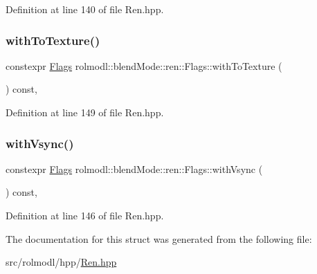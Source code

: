 Definition at line 140 of file Ren.\+hpp.

\mbox{\label{structrolmodl_1_1blend_mode_1_1ren_1_1_flags_ac6267b7a454ba636186bf26a2f7ca1b4}} 
\subsubsection{\texorpdfstring{withToTexture()}{withToTexture()}}
{\footnotesize\ttfamily constexpr \mbox{\hyperlink{structrolmodl_1_1blend_mode_1_1ren_1_1_flags}{Flags}} rolmodl\+::blend\+Mode\+::ren\+::\+Flags\+::with\+To\+Texture (\begin{DoxyParamCaption}{ }\end{DoxyParamCaption}) const\hspace{0.3cm}{\ttfamily [inline]}, {\ttfamily [noexcept]}}



Definition at line 149 of file Ren.\+hpp.

\mbox{\label{structrolmodl_1_1blend_mode_1_1ren_1_1_flags_a4f46047b69fbb8477a57f77700a92f3b}} 
\subsubsection{\texorpdfstring{withVsync()}{withVsync()}}
{\footnotesize\ttfamily constexpr \mbox{\hyperlink{structrolmodl_1_1blend_mode_1_1ren_1_1_flags}{Flags}} rolmodl\+::blend\+Mode\+::ren\+::\+Flags\+::with\+Vsync (\begin{DoxyParamCaption}{ }\end{DoxyParamCaption}) const\hspace{0.3cm}{\ttfamily [inline]}, {\ttfamily [noexcept]}}



Definition at line 146 of file Ren.\+hpp.



The documentation for this struct was generated from the following file\+:\begin{DoxyCompactItemize}
\item 
src/rolmodl/hpp/\mbox{\hyperlink{_ren_8hpp}{Ren.\+hpp}}\end{DoxyCompactItemize}
